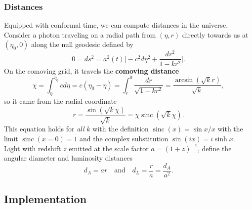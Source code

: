 \documentclass{aa}
\DeclareMathOperator{\sinc}{sinc}
\begin{document}
\subsubsection{Distances}

Equipped with conformal time, we can compute distances in the universe.
Consider a photon traveling on a radial path from $(\eta,r)$ directly towards us at $(\eta_0, 0)$ along the null geodesic defined by
\begin{equation*}
	0 = ds^2 = a^2(t) \Big[ -c^2 d\eta^2 + \frac{dr^2}{1-kr^2} \Big].
\end{equation*}
On the comoving grid, it travels the \textbf{comoving distance}
\begin{equation}
	\chi = \int_{\eta}^{\eta_0} c d\eta = c(\eta_0 - \eta) = \int_r^0 \frac{dr}{\sqrt{1-kr^2}} = \frac{\arcsin(\sqrt{k}r)}{\sqrt{k}},
\label{eq_comoving_distance}
\end{equation}
so it came from the radial coordinate
\begin{equation*}
	r = \frac{\sin(\sqrt{k}\chi)}{\sqrt{k}} = \chi \sinc(\sqrt{k}\chi).
\label{eq_radial_coordinate}
\end{equation*}
This equation holds for \emph{all} $k$ with the definition $\sinc(x) = \sin x / x$ with the limit $\sinc(x=0)=1$ and the complex substitution $\sin(ix) = i \sinh x$.
Light with redshift $z$ emitted at the scale factor $a = (1+z)^{-1}$,
define the angular diameter and luminosity distances
\begin{equation}
	d_A = a r
	\quad \text{and} \quad
	d_L = \frac{r}{a} = \frac{d_A}{a^2}.
\label{eq_distances}
\end{equation}



\subsection{Implementation}
\end{document}
